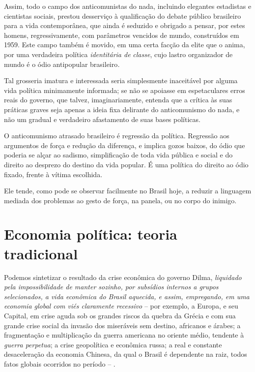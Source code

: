 Assim, todo o campo dos anticomunistas do nada, incluindo elegantes
estadistas e cientistas sociais, prestou desserviço à qualificação do
debate público brasileiro para a vida contemporânea, que ainda é
seduzido e obrigado a pensar, por estes homens, regressivamente, com
parâmetros vencidos de mundo, construídos em 1959. Este campo também é
movido, em uma certa facção da elite que o anima, por uma verdadeira
política \emph{identitária de} \emph{classe}, cujo lastro organizador de
mundo é o ódio antipopular brasileiro\emph{. }

Tal grosseria imatura e interessada seria simplesmente inaceitável por
alguma vida política minimamente informada; se não se apoiasse em
espetaculares erros reais do governo, que talvez, imaginariamente,
entenda que a crítica às suas práticas graves seja apenas a ideia fixa
delirante do anticomunismo do nada, e não um gradual e verdadeiro
afastamento de suas bases políticas.

O anticomunismo atrasado brasileiro é regressão da política. Regressão
aos argumentos de força e redução da diferença, e implica gozos baixos,
do ódio que poderia se alçar ao sadismo, simplificação de toda vida
pública e social e do direito ao desprezo do destino da vida
popular. É uma política do direito ao ódio fixado, frente à vítima
escolhida.

Ele tende, como pode se observar facilmente no Brasil hoje, a reduzir a
linguagem mediada dos problemas ao gesto de força, na panela, ou no
corpo do inimigo.

  \section{Economia política: teoria
  tradicional}\label{economia-poluxedtica-teoria-tradicional}

Podemos sintetizar o resultado da crise econômica do governo Dilma,
\emph{liquidado pela impossibilidade de manter sozinho, por subsídios
internos a grupos selecionados, a vida econômica do Brasil aquecida, e
assim, empregando, em uma economia global com viés claramente recessivo}
-- por exemplo, a Europa, e seu Capital, em crise aguda sob os grandes
riscos da quebra da Grécia e com sua grande crise social da invasão dos
miseráveis sem destino, africanos e árabes; a fragmentação e
multiplicação da guerra americana no oriente médio, tendente à
\emph{guerra perpetua}; a crise geopolítica e econômica russa; a real e
constante desaceleração da economia Chinesa, da qual o Brasil é
dependente na raiz, todos fatos globais ocorridos no período -- .

